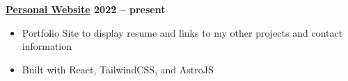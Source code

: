 \textbf{\href{https://liamearle.ca/}{Personal Website} \hfill 2022 -- present} \par
\begin{itemize}
	\item Portfolio Site to display resume and links to my other projects and contact information
    \item Built with React, TailwindCSS, and AstroJS
\end{itemize}\vspace{0.1cm}\par